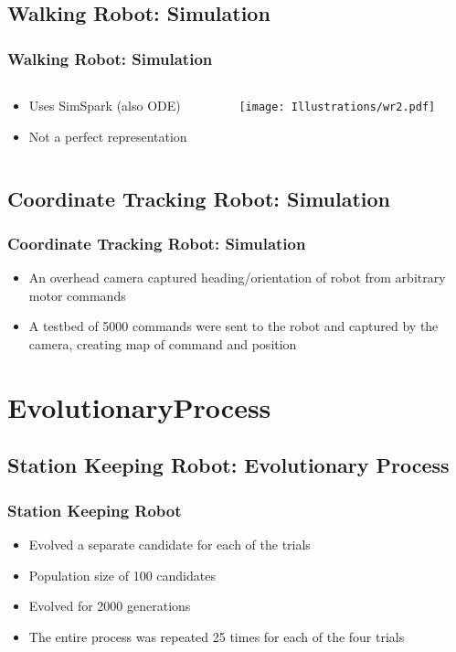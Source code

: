 \documentclass{beamer}
\begin{document}
\subsection{Walking Robot: Simulation}
\begin{frame}
  \frametitle{Walking Robot: Simulation}
\begin{columns}
  \begin{column}{0.5\textwidth}
\begin{itemize}
\item  Uses SimSpark (also ODE)
\item  Not a perfect representation
\end{itemize}
\end{column}
\begin{column}{0.5\textwidth}
 \texttt{[image: Illustrations/wr2.pdf]}
       \\
\end{column}
\end{columns}
\end{frame}

\subsection{Coordinate Tracking Robot: Simulation}
\begin{frame}
  \frametitle{Coordinate Tracking Robot: Simulation}
\begin{itemize}
\item An overhead camera captured heading/orientation of robot from arbitrary motor commands
\item A testbed of 5000 commands were sent to the robot and captured by the camera, creating map of command and position
\end{itemize}
\end{frame}

\section{EvolutionaryProcess}

\subsection{Station Keeping Robot: Evolutionary Process}
\begin{frame}
  \frametitle{Station Keeping Robot}
\begin{itemize}
\item Evolved a separate candidate for each of the trials
\item Population size of 100 candidates
\item Evolved for 2000 generations
\item The entire process was repeated 25 times for each of the four trials
\end{itemize}
\end{frame}
\end{document}
